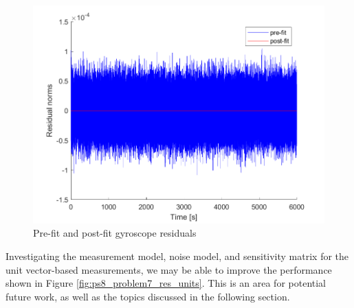 \begin{figure}[H]
\centering
\includegraphics[scale=0.8]{Images/ps8_problem7_res_gyro.png}
\caption{Pre-fit and post-fit gyroscope residuals}
\label{fig:ps8_problem7_res_gyro}
\end{figure}

Investigating the measurement model, noise model, and sensitivity matrix for the unit vector-based measurements, we may be able to improve the performance shown in Figure \ref{fig:ps8_problem7_res_units}. This is an area for potential future work, as well as the topics discussed in the following section.